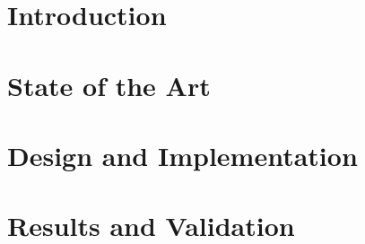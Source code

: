 \documentclass[a4paper,oneside,12pt]{book}
\begin{document}




\tableofcontents
\listoffigures
\listoftables
\pagebreak

\chapter{Introduction}
\chapter{State of the Art}


\chapter{Design and Implementation}


\chapter{Results and Validation}



\begin{footnotesize}
\cleardoublepage
{}


\end{footnotesize}
\end{document}
